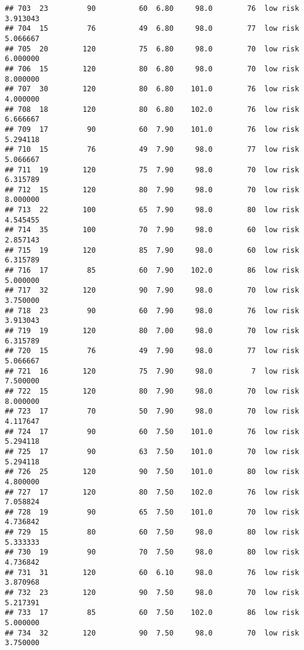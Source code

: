 \documentclass[
  ignorenonframetext,
]{beamer}
\begin{document}
\begin{frame}[fragile]
\begin{verbatim}
## 703  23         90          60  6.80     98.0        76  low risk      3.913043
## 704  15         76          49  6.80     98.0        77  low risk      5.066667
## 705  20        120          75  6.80     98.0        70  low risk      6.000000
## 706  15        120          80  6.80     98.0        70  low risk      8.000000
## 707  30        120          80  6.80    101.0        76  low risk      4.000000
## 708  18        120          80  6.80    102.0        76  low risk      6.666667
## 709  17         90          60  7.90    101.0        76  low risk      5.294118
## 710  15         76          49  7.90     98.0        77  low risk      5.066667
## 711  19        120          75  7.90     98.0        70  low risk      6.315789
## 712  15        120          80  7.90     98.0        70  low risk      8.000000
## 713  22        100          65  7.90     98.0        80  low risk      4.545455
## 714  35        100          70  7.90     98.0        60  low risk      2.857143
## 715  19        120          85  7.90     98.0        60  low risk      6.315789
## 716  17         85          60  7.90    102.0        86  low risk      5.000000
## 717  32        120          90  7.90     98.0        70  low risk      3.750000
## 718  23         90          60  7.90     98.0        76  low risk      3.913043
## 719  19        120          80  7.00     98.0        70  low risk      6.315789
## 720  15         76          49  7.90     98.0        77  low risk      5.066667
## 721  16        120          75  7.90     98.0         7  low risk      7.500000
## 722  15        120          80  7.90     98.0        70  low risk      8.000000
## 723  17         70          50  7.90     98.0        70  low risk      4.117647
## 724  17         90          60  7.50    101.0        76  low risk      5.294118
## 725  17         90          63  7.50    101.0        70  low risk      5.294118
## 726  25        120          90  7.50    101.0        80  low risk      4.800000
## 727  17        120          80  7.50    102.0        76  low risk      7.058824
## 728  19         90          65  7.50    101.0        70  low risk      4.736842
## 729  15         80          60  7.50     98.0        80  low risk      5.333333
## 730  19         90          70  7.50     98.0        80  low risk      4.736842
## 731  31        120          60  6.10     98.0        76  low risk      3.870968
## 732  23        120          90  7.50     98.0        70  low risk      5.217391
## 733  17         85          60  7.50    102.0        86  low risk      5.000000
## 734  32        120          90  7.50     98.0        70  low risk      3.750000

\end{verbatim}
\end{frame}
\end{document}
